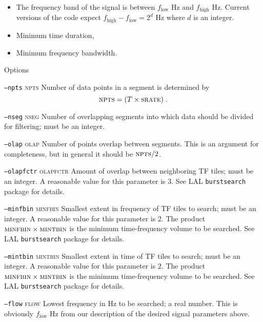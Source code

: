 \begin{entry}
\begin{itemize}
\item The frequency band of the signal is between $f_{\mathrm{low}}$
Hz and ${f_{\mathrm{high}}}$ Hz.  Current versions of the code
expect ${f_{\mathrm{high}}}-{f_{\mathrm{low}}}=2^d$ Hz where
$d$ is an integer. 

\item Minimum time duration,

\item Minimum frequency bandwidth.
\end{itemize}

\item[Options]\leavevmode
\begin{entry}
\item[\texttt{--npts}  \textsc{npts}] Number of data points in a
segment is determined by
\[
\mbox{\textsc{npts}} = (T \times \mbox{\textsc{srate}}) \; .
\]  

\item[\texttt{--nseg} \textsc{nseg}] Number of overlapping segments into
which data should be divided for filtering;  must be an integer. 

\item[\texttt{--olap} \textsc{olap}] Number of points overlap between
segments.  This is an argument for completeness,  but in general it
should be $\textsc{npts}/2$.

\item[\texttt{--olapfctr} \textsc{olapfctr}] Amount of overlap between
neighboring TF tiles; must be an integer.  A reasonable value for this
parameter is $3$.  See LAL \texttt{burstsearch} package for details.  

\item[\texttt{--minfbin} \textsc{minfbin}] Smallest extent in frequency of
TF tiles to search;  must be an integer.  A reasonable value for this
parameter is $2$.   The product $\mbox{\textsc{minfbin}} \times
\mbox{\textsc{mintbin}}$ is the minimum time-frequency volume to
be searched.  See LAL \texttt{burstsearch} package for details.

\item[\texttt{--mintbin} \textsc{mintbin}] Smallest extent in time of TF
tiles to search;  must be an integer. A reasonable value for this
parameter is $2$.   The product $\mbox{\textsc{minfbin}} \times
\mbox{\textsc{mintbin}}$ is the minimum time-frequency volume to
be searched.  See LAL \texttt{burstsearch} package for details.

\item[\texttt{--flow} \textsc{flow}] Lowest frequency in Hz to be searched;
a real number.  This is obviously $f_{\mathrm{low}}$ Hz from our
description of the desired signal parameters above.


\end{entry}
\end{entry}

